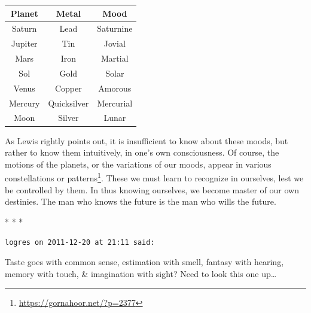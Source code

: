 \begin{table}[h]\small\centering
\begin{tabular}{ccc}\toprule
\textbf{Planet} &
\textbf{Metal} &
\textbf{Mood}\\\midrule
Saturn &
Lead &
Saturnine\\
Jupiter &
Tin &
Jovial\\
Mars &
Iron &
Martial\\
Sol &
Gold &
Solar\\
Venus &
Copper &
Amorous\\
Mercury &
Quicksilver &
Mercurial\\
Moon &
Silver &
Lunar\\\bottomrule
\end{tabular}
\end{table}
As Lewis rightly points out, it is insufficient to know about these moods, but rather to know them intuitively, in one's own consciousness. Of course, the motions of the planets, or the variations of our moods, appear in various constellations or patterns\footnote{\url{https://gornahoor.net/?p=2377}}. These we must learn to recognize in ourselves, lest we be controlled by them. In thus knowing ourselves, we become master of our own destinies. The man who knows the future is the man who wills the future.




\begin{center}* * *\end{center}

\begin{footnotesize}\begin{sffamily}



\texttt{logres on 2011-12-20 at 21:11 said: }

Taste goes with common sense, estimation with smell, fantasy with hearing, memory with touch, \& imagination with sight? Need to look this one up…

\hfill

\end{sffamily}\end{footnotesize}
